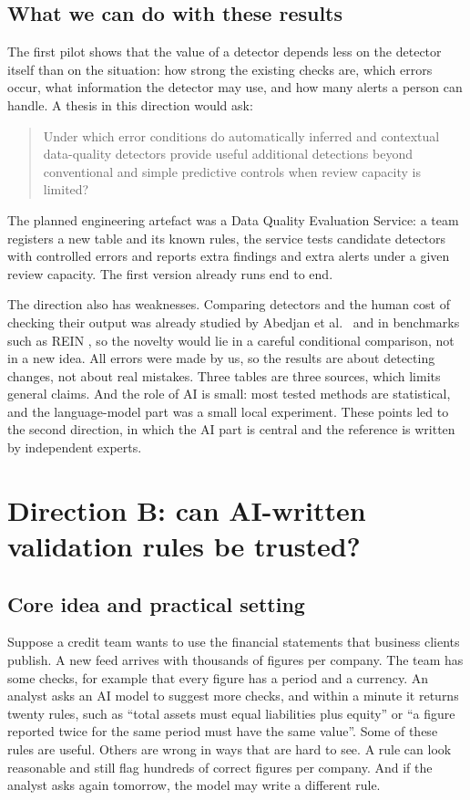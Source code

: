 \documentclass[11pt,a4paper]{article}
\begin{document}
\subsection{What we can do with these results}

The first pilot shows that the value of a detector depends less on the detector itself than on the situation: how strong the existing checks are, which errors occur, what information the detector may use, and how many alerts a person can handle. A thesis in this direction would ask:

\begin{quote}
Under which error conditions do automatically inferred and contextual data-quality detectors provide useful additional detections beyond conventional and simple predictive controls when review capacity is limited?
\end{quote}

The planned engineering artefact was a Data Quality Evaluation Service: a team registers a new table and its known rules, the service tests candidate detectors with controlled errors and reports extra findings and extra alerts under a given review capacity. The first version already runs end to end.

The direction also has weaknesses. Comparing detectors and the human cost of checking their output was already studied by Abedjan et al.\ \cite{abedjan} and in benchmarks such as REIN \cite{rein}, so the novelty would lie in a careful conditional comparison, not in a new idea. All errors were made by us, so the results are about detecting changes, not about real mistakes. Three tables are three sources, which limits general claims. And the role of AI is small: most tested methods are statistical, and the language-model part was a small local experiment. These points led to the second direction, in which the AI part is central and the reference is written by independent experts.

\section{Direction B: can AI-written validation rules be trusted?}

\subsection{Core idea and practical setting}

Suppose a credit team wants to use the financial statements that business clients publish. A new feed arrives with thousands of figures per company. The team has some checks, for example that every figure has a period and a currency. An analyst asks an AI model to suggest more checks, and within a minute it returns twenty rules, such as ``total assets must equal liabilities plus equity'' or ``a figure reported twice for the same period must have the same value''. Some of these rules are useful. Others are wrong in ways that are hard to see. A rule can look reasonable and still flag hundreds of correct figures per company. And if the analyst asks again tomorrow, the model may write a different rule.
\end{document}

